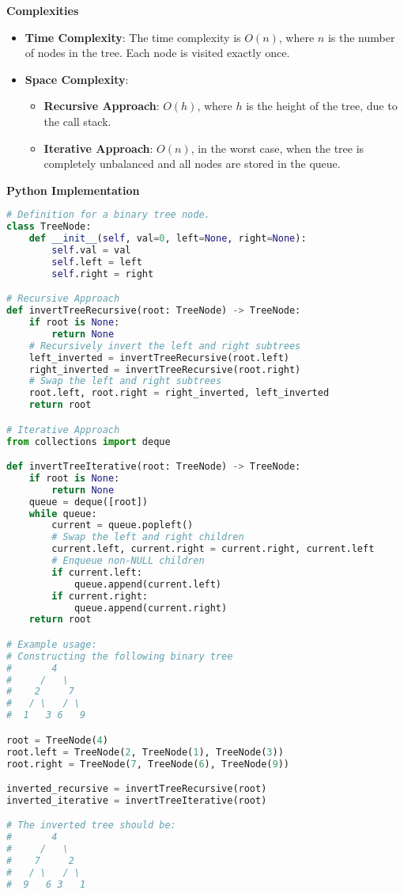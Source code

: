 \textbf{Complexities}

\begin{itemize}
    \item \textbf{Time Complexity}: The time complexity is \(O(n)\), where \(n\) is the number of nodes in the tree. Each node is visited exactly once.
    \item \textbf{Space Complexity}: 
    \begin{itemize}
        \item \textbf{Recursive Approach}: \(O(h)\), where \(h\) is the height of the tree, due to the call stack.
        \item \textbf{Iterative Approach}: \(O(n)\), in the worst case, when the tree is completely unbalanced and all nodes are stored in the queue.
    \end{itemize}
\end{itemize}

\textbf{Python Implementation}

\begin{lstlisting}[language=Python, xleftmargin=0.02\textwidth, xrightmargin=0.02\textwidth]
# Definition for a binary tree node.
class TreeNode:
    def __init__(self, val=0, left=None, right=None):
        self.val = val
        self.left = left
        self.right = right

# Recursive Approach
def invertTreeRecursive(root: TreeNode) -> TreeNode:
    if root is None:
        return None
    # Recursively invert the left and right subtrees
    left_inverted = invertTreeRecursive(root.left)
    right_inverted = invertTreeRecursive(root.right)
    # Swap the left and right subtrees
    root.left, root.right = right_inverted, left_inverted
    return root

# Iterative Approach
from collections import deque

def invertTreeIterative(root: TreeNode) -> TreeNode:
    if root is None:
        return None
    queue = deque([root])
    while queue:
        current = queue.popleft()
        # Swap the left and right children
        current.left, current.right = current.right, current.left
        # Enqueue non-NULL children
        if current.left:
            queue.append(current.left)
        if current.right:
            queue.append(current.right)
    return root

# Example usage:
# Constructing the following binary tree
#       4
#     /   \
#    2     7
#   / \   / \
#  1   3 6   9

root = TreeNode(4)
root.left = TreeNode(2, TreeNode(1), TreeNode(3))
root.right = TreeNode(7, TreeNode(6), TreeNode(9))

inverted_recursive = invertTreeRecursive(root)
inverted_iterative = invertTreeIterative(root)

# The inverted tree should be:
#       4
#     /   \
#    7     2
#   / \   / \
#  9   6 3   1
\end{lstlisting}

